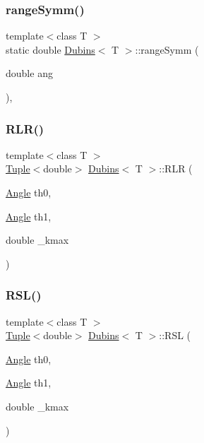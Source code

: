 \mbox{\label{class_dubins_a1f80a03865231b60841bc8ec7623c04f}} 
\subsubsection{\texorpdfstring{rangeSymm()}{rangeSymm()}}
{\footnotesize\ttfamily template$<$class T $>$ \\
static double \mbox{\hyperlink{class_dubins}{Dubins}}$<$ T $>$\+::range\+Symm (\begin{DoxyParamCaption}\item[{double}]{ang }\end{DoxyParamCaption})\hspace{0.3cm}{\ttfamily [inline]}, {\ttfamily [static]}}

\mbox{\label{class_dubins_a09a20074da623512c1a7a0cc68ad0dcb}} 
\subsubsection{\texorpdfstring{RLR()}{RLR()}}
{\footnotesize\ttfamily template$<$class T $>$ \\
\mbox{\hyperlink{class_tuple}{Tuple}}$<$double$>$ \mbox{\hyperlink{class_dubins}{Dubins}}$<$ T $>$\+::R\+LR (\begin{DoxyParamCaption}\item[{\mbox{\hyperlink{class_angle}{Angle}}}]{th0,  }\item[{\mbox{\hyperlink{class_angle}{Angle}}}]{th1,  }\item[{double}]{\+\_\+kmax }\end{DoxyParamCaption})\hspace{0.3cm}{\ttfamily [inline]}}

\mbox{\label{class_dubins_ab7e43f4565146912615837d5ef758cc2}} 
\subsubsection{\texorpdfstring{RSL()}{RSL()}}
{\footnotesize\ttfamily template$<$class T $>$ \\
\mbox{\hyperlink{class_tuple}{Tuple}}$<$double$>$ \mbox{\hyperlink{class_dubins}{Dubins}}$<$ T $>$\+::R\+SL (\begin{DoxyParamCaption}\item[{\mbox{\hyperlink{class_angle}{Angle}}}]{th0,  }\item[{\mbox{\hyperlink{class_angle}{Angle}}}]{th1,  }\item[{double}]{\+\_\+kmax }\end{DoxyParamCaption})\hspace{0.3cm}{\ttfamily [inline]}}

